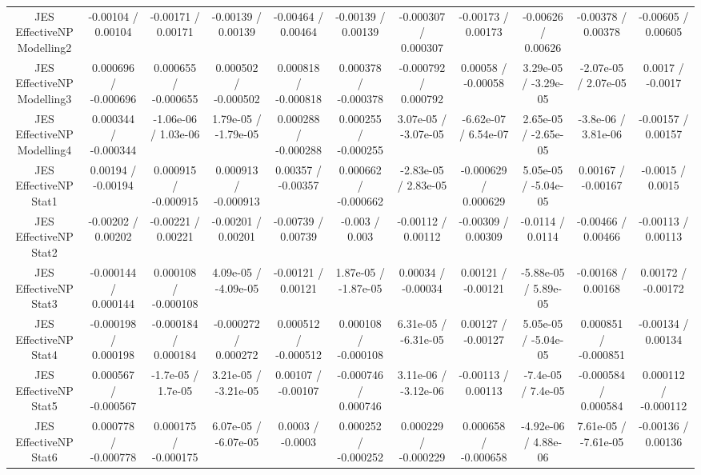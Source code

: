 \begin{table}[htbp]
\begin{center}
\begin{tabular}{|c|c|c|c|c|c|c|c|c|c|c|}
  JES EffectiveNP Modelling2 & -0.00104 / 0.00104 & -0.00171 / 0.00171 & -0.00139 / 0.00139 & -0.00464 / 0.00464 & -0.00139 / 0.00139 & -0.000307 / 0.000307 & -0.00173 / 0.00173 & -0.00626 / 0.00626 & -0.00378 / 0.00378 & -0.00605 / 0.00605 \\ 
  JES EffectiveNP Modelling3 & 0.000696 / -0.000696 & 0.000655 / -0.000655 & 0.000502 / -0.000502 & 0.000818 / -0.000818 & 0.000378 / -0.000378 & -0.000792 / 0.000792 & 0.00058 / -0.00058 & 3.29e-05 / -3.29e-05 & -2.07e-05 / 2.07e-05 & 0.0017 / -0.0017 \\ 
  JES EffectiveNP Modelling4 & 0.000344 / -0.000344 & -1.06e-06 / 1.03e-06 & 1.79e-05 / -1.79e-05 & 0.000288 / -0.000288 & 0.000255 / -0.000255 & 3.07e-05 / -3.07e-05 & -6.62e-07 / 6.54e-07 & 2.65e-05 / -2.65e-05 & -3.8e-06 / 3.81e-06 & -0.00157 / 0.00157 \\ 
  JES EffectiveNP Stat1 & 0.00194 / -0.00194 & 0.000915 / -0.000915 & 0.000913 / -0.000913 & 0.00357 / -0.00357 & 0.000662 / -0.000662 & -2.83e-05 / 2.83e-05 & -0.000629 / 0.000629 & 5.05e-05 / -5.04e-05 & 0.00167 / -0.00167 & -0.0015 / 0.0015 \\ 
  JES EffectiveNP Stat2 & -0.00202 / 0.00202 & -0.00221 / 0.00221 & -0.00201 / 0.00201 & -0.00739 / 0.00739 & -0.003 / 0.003 & -0.00112 / 0.00112 & -0.00309 / 0.00309 & -0.0114 / 0.0114 & -0.00466 / 0.00466 & -0.00113 / 0.00113 \\ 
  JES EffectiveNP Stat3 & -0.000144 / 0.000144 & 0.000108 / -0.000108 & 4.09e-05 / -4.09e-05 & -0.00121 / 0.00121 & 1.87e-05 / -1.87e-05 & 0.00034 / -0.00034 & 0.00121 / -0.00121 & -5.88e-05 / 5.89e-05 & -0.00168 / 0.00168 & 0.00172 / -0.00172 \\ 
  JES EffectiveNP Stat4 & -0.000198 / 0.000198 & -0.000184 / 0.000184 & -0.000272 / 0.000272 & 0.000512 / -0.000512 & 0.000108 / -0.000108 & 6.31e-05 / -6.31e-05 & 0.00127 / -0.00127 & 5.05e-05 / -5.04e-05 & 0.000851 / -0.000851 & -0.00134 / 0.00134 \\ 
  JES EffectiveNP Stat5 & 0.000567 / -0.000567 & -1.7e-05 / 1.7e-05 & 3.21e-05 / -3.21e-05 & 0.00107 / -0.00107 & -0.000746 / 0.000746 & 3.11e-06 / -3.12e-06 & -0.00113 / 0.00113 & -7.4e-05 / 7.4e-05 & -0.000584 / 0.000584 & 0.000112 / -0.000112 \\ 
  JES EffectiveNP Stat6 & 0.000778 / -0.000778 & 0.000175 / -0.000175 & 6.07e-05 / -6.07e-05 & 0.0003 / -0.0003 & 0.000252 / -0.000252 & 0.000229 / -0.000229 & 0.000658 / -0.000658 & -4.92e-06 / 4.88e-06 & 7.61e-05 / -7.61e-05 & -0.00136 / 0.00136 \\ 

\end{tabular}
\end{center}
\end{table}
